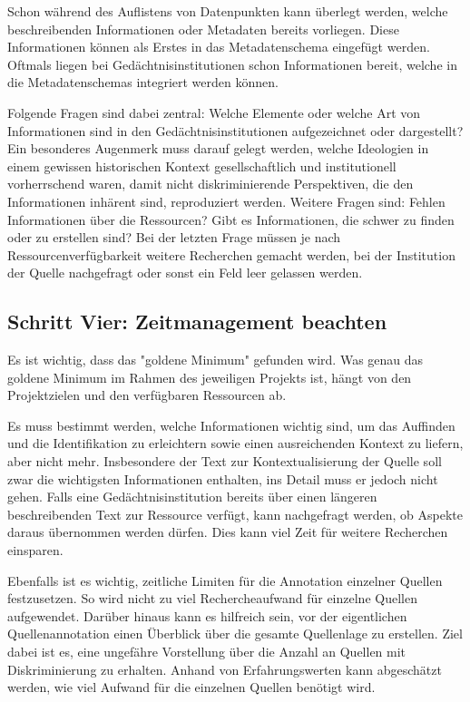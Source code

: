 \documentclass[
  nswissgerman,
  letterpaper,
  DIV=11,
  numbers=noendperiod]{scrartcl}
\begin{document}
Schon während des Auflistens von Datenpunkten kann überlegt werden,
welche beschreibenden Informationen oder Metadaten bereits vorliegen.
Diese Informationen können als Erstes in das Metadatenschema eingefügt
werden. Oftmals liegen bei Gedächtnisinstitutionen schon Informationen
bereit, welche in die Metadatenschemas integriert werden können.

Folgende Fragen sind dabei zentral: Welche Elemente oder welche Art von
Informationen sind in den Gedächtnisinstitutionen aufgezeichnet oder
dargestellt? Ein besonderes Augenmerk muss darauf gelegt werden, welche
Ideologien in einem gewissen historischen Kontext gesellschaftlich und
institutionell vorherrschend waren, damit nicht diskriminierende
Perspektiven, die den Informationen inhärent sind, reproduziert werden.
Weitere Fragen sind: Fehlen Informationen über die Ressourcen? Gibt es
Informationen, die schwer zu finden oder zu erstellen sind? Bei der
letzten Frage müssen je nach Ressourcenverfügbarkeit weitere Recherchen
gemacht werden, bei der Institution der Quelle nachgefragt oder sonst
ein Feld leer gelassen werden.

\subsection{Schritt Vier: Zeitmanagement
beachten~~}\label{schritt-vier-zeitmanagement-beachten}

Es ist wichtig, dass das "goldene Minimum" gefunden wird. Was genau das
goldene Minimum im Rahmen des jeweiligen Projekts ist, hängt von den
Projektzielen und den verfügbaren Ressourcen ab.

Es muss bestimmt werden, welche Informationen wichtig sind, um das
Auffinden und die Identifikation zu erleichtern sowie einen
ausreichenden Kontext zu liefern, aber nicht mehr. Insbesondere der Text
zur Kontextualisierung der Quelle soll zwar die wichtigsten
Informationen enthalten, ins Detail muss er jedoch nicht gehen. Falls
eine Gedächtnisinstitution bereits über einen längeren beschreibenden
Text zur Ressource verfügt, kann nachgefragt werden, ob Aspekte daraus
übernommen werden dürfen. Dies kann viel Zeit für weitere Recherchen
einsparen.

Ebenfalls ist es wichtig, zeitliche Limiten für die Annotation einzelner
Quellen festzusetzen. So wird nicht zu viel Rechercheaufwand für
einzelne Quellen aufgewendet. Darüber hinaus kann es hilfreich sein, vor
der eigentlichen Quellenannotation einen Überblick über die gesamte
Quellenlage zu erstellen. Ziel dabei ist es, eine ungefähre Vorstellung
über die Anzahl an Quellen mit Diskriminierung zu erhalten. Anhand von
Erfahrungswerten kann abgeschätzt werden, wie viel Aufwand für die
einzelnen Quellen benötigt wird.
\end{document}

